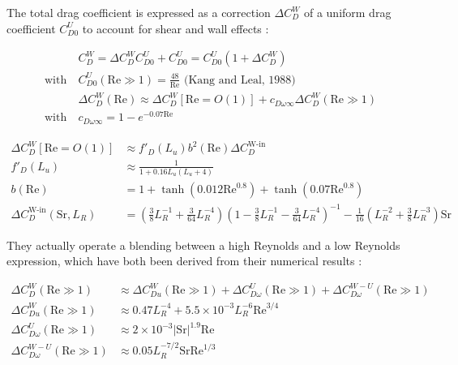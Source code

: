 The total drag coefficient is expressed as a correction $\Delta C_{D}^{W}$ of a uniform drag coefficient $C_{D0}^{U}$ to account for shear and wall effects :


\begin{align}
&C_{D}^{W}=\Delta C_{D}^{W} C_{D0}^{U} + C_{D0}^{U} = C_{D0}^{U} \left( 1 + \Delta C_{D}^{W}\right)\\
\text{with}\  &C_{D0}^{U}\left(\text{Re} \gg 1 \right) = \frac{48}{\text{Re}} \text{ (Kang and Leal, 1988)}\\
&\Delta C_{D}^{W} \left(\text{Re}\right) \approx \Delta C_{D}^{W}\left[\text{Re}=O(1)\right] + c_{D\omega\infty}\Delta C_{D}^{W}\left(\text{Re}\gg1\right)\\
\text{with}\  &c_{D\omega\infty}=1-e^{-0.07\text{Re}}
\end{align}

\npar
\begin{align}
\Delta C_{D}^{W}\left[\text{Re}=O(1)\right] &\approx f'_{D}\left(L_{u}\right)b^{2}\left(\text{Re}\right)\Delta C_{D}^{\text{W-in}}\\
f'_{D}\left(L_{u}\right)&\approx \frac{1}{1+0.16L_{u}\left(L_{u}+4\right)} \\
b\left(\text{Re}\right)&= 1 + \tanh\left(0.012\text{Re}^{0.8}\right)+\tanh\left(0.07\text{Re}^{0.8}\right) \\
\Delta C_{D}^{\text{W-in}}\left(\text{Sr},L_{R}\right)&=\left(\frac{3}{8}L_{R}^{-1} + \frac{3}{64}L_{R}^{-4}\right) \left(1- \frac{3}{8}L_{R}^{-1}-\frac{3}{64}L_{R}^{-4}\right)^{-1} - \frac{1}{16}\left(L_{R}^{-2}+\frac{3}{8}L_{R}^{-3}\right)\text{Sr}
\end{align}

They actually operate a blending between a high Reynolds and a low Reynolds expression, which have both been derived from their numerical results :

\npar
\begin{align}
\Delta C_{D}^{W}\left(\text{Re}\gg1 \right) &\approx \Delta C_{Du}^{W}\left(\text{Re}\gg1\right) + \Delta C_{D\omega}^{U}\left(\text{Re}\gg1\right) + \Delta C_{D\omega}^{W-U}\left(\text{Re}\gg1\right)\\
\Delta C_{Du}^{W}\left(\text{Re}\gg1\right) &\approx 0.47L_{R}^{-4}+5.5\times 10^{-3}L_{R}^{-6}\text{Re}^{3/4} \\
\Delta C_{D\omega}^{U}\left(\text{Re}\gg1\right) &\approx 2 \times 10^{-3} \left|\text{Sr}\right|^{1.9}\text{Re} \\
\Delta C_{D\omega}^{W-U}\left(\text{Re}\gg1\right)&\approx 0.05L_{R}^{-7/2}\text{Sr}\text{Re}^{1/3}
\end{align}


